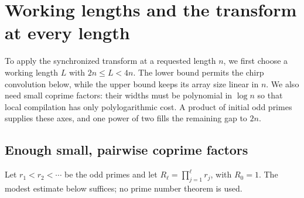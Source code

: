 \section{Working lengths and the transform at every length}
\label{sec:all-lengths}

To apply the synchronized transform at a requested length $n$, we first
choose a working length $L$ with $2n\le L<4n$. The lower bound permits
the chirp convolution below, while the upper bound keeps its array size
linear in $n$. We also need small coprime factors: their widths must be
polynomial in $\log n$ so that local compilation has only polylogarithmic
cost. A product of initial odd primes supplies these axes, and one
power of two fills the remaining gap to $2n$.

\subsection{Enough small, pairwise coprime factors}

Let $r_1<r_2<\cdots$ be the odd primes and let $R_\ell=\prod_{j=1}^{\ell}r_j$, with $R_0=1$. The modest estimate below suffices; no prime number theorem is used.

